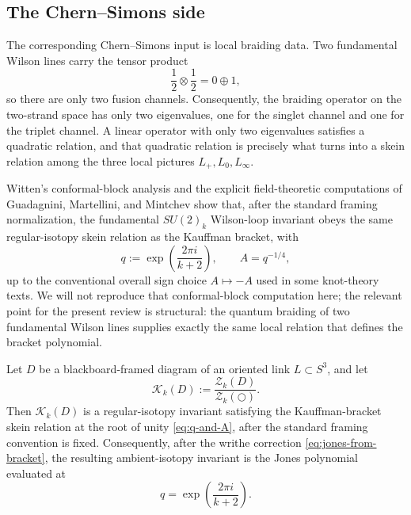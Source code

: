 \subsection{The Chern--Simons side}

The corresponding Chern--Simons input is local braiding data. Two fundamental Wilson lines carry the tensor product
\begin{equation}\label{eq:fundamental-fusion}
\frac12 \otimes \frac12 = 0 \oplus 1,
\end{equation}
so there are only two fusion channels. Consequently, the braiding operator on the two-strand space has only two eigenvalues, one for the singlet channel and one for the triplet channel. A linear operator with only two eigenvalues satisfies a quadratic relation, and that quadratic relation is precisely what turns into a skein relation among the three local pictures $L_+,L_0,L_\infty$.

\medskip

\noindent Witten's conformal-block analysis \cite{Witten1989Jones} and the explicit field-theoretic computations of Guadagnini, Martellini, and Mintchev \cite{GuadagniniMartelliniMintchev1990} show that, after the standard framing normalization, the fundamental $SU(2)_k$ Wilson-loop invariant obeys the same regular-isotopy skein relation as the Kauffman bracket, with
\begin{equation}\label{eq:q-and-A}
q := \exp\left(\frac{2\pi i}{k+2}\right),
\qquad
A = q^{-1/4},
\end{equation}
up to the conventional overall sign choice $A \mapsto -A$ used in some knot-theory texts. We will not reproduce that conformal-block computation here; the relevant point for the present review is structural: the quantum braiding of two fundamental Wilson lines supplies exactly the same local relation that defines the bracket polynomial.

\begin{theorem}\label{thm:witten-jones-bridge}
Let $D$ be a blackboard-framed diagram of an oriented link $L \subset S^3$, and let
\begin{equation}\label{eq:normalized-CS-bracket}
\mathcal{K}_k(D)
:=
\frac{\mathcal{Z}_k(D)}{\mathcal{Z}_k(\bigcirc)}.
\end{equation}
Then $\mathcal{K}_k(D)$ is a regular-isotopy invariant satisfying the Kauffman-bracket skein relation at the root of unity \eqref{eq:q-and-A}, after the standard framing convention is fixed. Consequently, after the writhe correction \eqref{eq:jones-from-bracket}, the resulting ambient-isotopy invariant is the Jones polynomial evaluated at
\begin{equation}\label{eq:jones-root}
q = \exp\left(\frac{2\pi i}{k+2}\right).
\end{equation}
\end{theorem}

